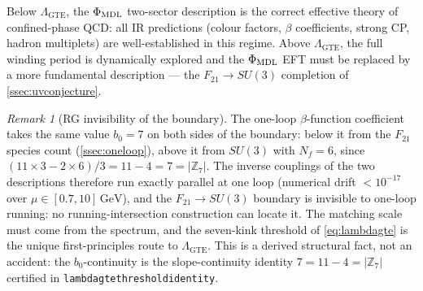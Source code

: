 \documentclass[11pt]{article}
\theoremstyle{remark}
\newtheorem{remark}[theorem]{Remark}
\newcommand{\GTE}{\text{GTE}}
\newcommand{\ZS}{\mathbb{Z}_7}
\newcommand{\phimdl}{\Phi_{\rm MDL}}
\newcommand{\Ftwentyone}{F_{21}}
\newcommand{\lean}[1]{%
  \penalty-100
  \begingroup\def\_{\textunderscore\allowbreak}\texttt{#1}\endgroup}
\begin{document}
Below $\Lambda_{\GTE}$, the $\phimdl$ two-sector description is the correct
effective theory of confined-phase QCD: all IR predictions (colour factors,
$\beta$ coefficients, strong CP, hadron multiplets) are well-established in
this regime.
Above $\Lambda_{\GTE}$, the full winding period is dynamically explored and
the $\phimdl$ EFT must be replaced by a more fundamental description --- the
$\Ftwentyone \to SU(3)$ completion of \cref{ssec:uvconjecture}.

\begin{remark}[RG invisibility of the boundary]
\label{rem:rginvisible}
The one-loop $\beta$-function coefficient takes the same value $b_0 = 7$ on
both sides of the boundary: below it from the $\Ftwentyone$ species count
(\cref{ssec:oneloop}), above it from $SU(3)$ with $N_f = 6$, since
$(11 \times 3 - 2 \times 6)/3 = 11 - 4 = 7 = |\ZS|$.
The inverse couplings of the two descriptions therefore run exactly parallel
at one loop (numerical drift $< 10^{-17}$ over $\mu \in [0.7,
10]\,\mathrm{GeV}$), and the $\Ftwentyone \to SU(3)$ boundary is invisible to
one-loop running: no running-intersection construction can locate it.
The matching scale must come from the spectrum, and the seven-kink threshold
of \cref{eq:lambdagte} is the unique first-principles route to
$\Lambda_{\GTE}$.
This is a derived structural fact, not an accident: the $b_0$-continuity is
the slope-continuity identity $7 = 11 - 4 = |\ZS|$ certified in
\lean{lambda\_gte\_threshold\_identity}.
\end{remark}
\end{document}
